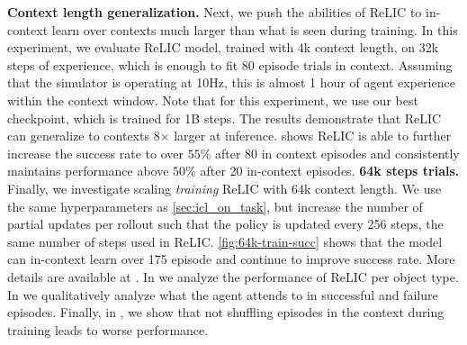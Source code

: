 \documentclass{article}
\newcommand{\method}{ReLIC\xspace}
\begin{document}
\textbf{Context length generalization.} Next, we push the abilities of \method to in-context learn over contexts much larger than what is seen during training. In this experiment, we evaluate \method model, trained with 4k context length, on 32k steps of experience, which is enough to fit 80 episode trials in context. Assuming that the simulator is operating at 10Hz, this is almost 1 hour of agent experience within the context window. Note that for this experiment, we use our best checkpoint, which is trained for 1B steps. The results demonstrate that \method can generalize to contexts 8$\times$ larger at inference.  shows \method is able to further increase the success rate to over $ 55\% $ after 80 in context episodes and consistently maintains performance above $ 50 \% $ after 20 in-context episodes.
\textbf{64k steps trials.} Finally, we investigate scaling \textit{training} \method with 64k context length. We use the same hyperparameters as \cref{sec:icl_on_task}, but increase the number of partial updates per rollout such that the policy is updated every 256 steps, the same number of steps used in \method. \cref{fig:64k-train-succ} shows that the model can in-context learn over 175 episode and continue to improve success rate. More details are available at .
In  we analyze the performance of \method per object type. In  we qualitatively analyze what the agent attends to in successful and failure episodes. Finally, in , we show that not shuffling episodes in the context during training leads to worse performance.
\vspace{-5pt}
\end{document}
